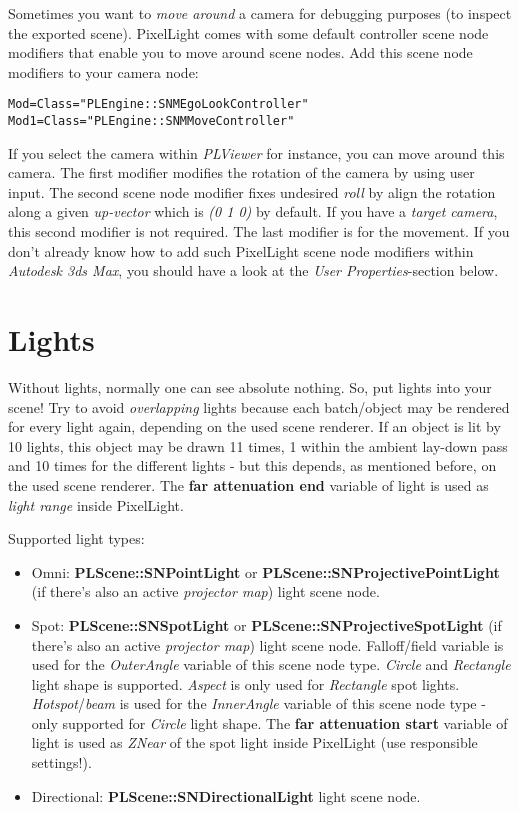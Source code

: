Sometimes you want to \emph{move around} a camera for debugging purposes (to inspect the exported scene). PixelLight comes with some default controller scene node modifiers that enable you to move around scene nodes. Add this scene node modifiers to your camera node:

\begin{lstlisting}[caption=Free camera scene node modifiers]
Mod=Class="PLEngine::SNMEgoLookController"
Mod1=Class="PLEngine::SNMMoveController"
\end{lstlisting}

If you select the camera within \emph{PLViewer} for instance, you can move around this camera. The first modifier modifies the rotation of the camera by using user input. The second scene node modifier fixes undesired \emph{roll} by align the rotation along a given \emph{up-vector} which is \emph{(0 1 0)} by default. If you have a \emph{target camera}, this second modifier is not required. The last modifier is for the movement. If you don't already know how to add such PixelLight scene node modifiers within \emph{Autodesk 3ds Max}, you should have a look at the \emph{User Properties}-section below.




\section{Lights}
Without lights, normally one can see absolute nothing. So, put lights into your scene! Try to avoid \emph{overlapping} lights because each batch/object may be rendered for every light again, depending on the used scene renderer. If an object is lit by 10 lights, this object may be drawn 11 times, 1 within the ambient lay-down pass and 10 times for the different lights - but this depends, as mentioned before, on the used scene renderer. The \textbf{far attenuation end} variable of light is used as \emph{light range} inside PixelLight.

Supported light types:
\begin{itemize}
\item{Omni: \textbf{PLScene::SNPointLight} or \textbf{PLScene::SNProjectivePointLight} (if there's also an active \emph{projector map}) light scene node.}
\item{Spot: \textbf{PLScene::SNSpotLight} or \textbf{PLScene::SNProjectiveSpotLight} (if there's also an active \emph{projector map}) light scene node. Falloff/field variable is used for the \emph{OuterAngle} variable of this scene node type. \emph{Circle} and \emph{Rectangle} light shape is supported. \emph{Aspect} is only used for \emph{Rectangle} spot lights. \emph{Hotspot}/\emph{beam} is used for the \emph{InnerAngle} variable of this scene node type - only supported for \emph{Circle} light shape. The \textbf{far attenuation start} variable of light is used as \emph{ZNear} of the spot light inside PixelLight (use responsible settings!).}
\item{Directional: \textbf{PLScene::SNDirectionalLight} light scene node.}
\end{itemize}

